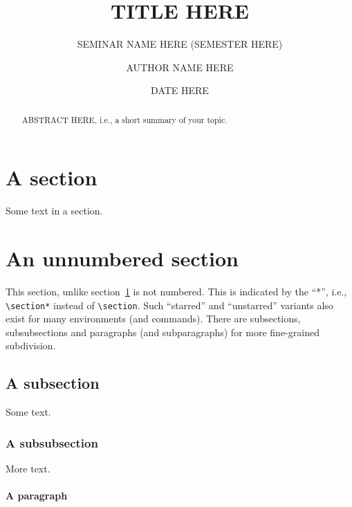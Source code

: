\documentclass[11pt]{scrartcl}
\title{TITLE HERE} %
\subtitle{SEMINAR NAME HERE (SEMESTER HERE)} %
\author{AUTHOR NAME HERE} %
\date{DATE HERE} %
\theoremstyle{plain} %
\theoremstyle{definition} %
\theoremstyle{remark} %
\begin{document}


\begin{abstract}
ABSTRACT HERE, i.e., a short summary of your topic.
\end{abstract}


\section{A section}
\label{sec:a-section}

Some text in a section.

\section*{An unnumbered section}

This section, unlike section~\ref{sec:a-section} is not numbered.
This is indicated by the ``*'', i.e., \verb|\section*| instead of \verb|\section|.
Such ``starred'' and ``unstarred'' variants also exist for many environments (and commands).
There are subsections, subsubsections and paragraphs (and subparagraphs) for more fine-grained subdivision.

\subsection*{A subsection}

Some text.

\subsubsection*{A subsubsection}

More text.

\paragraph*{A paragraph}
\end{document}
